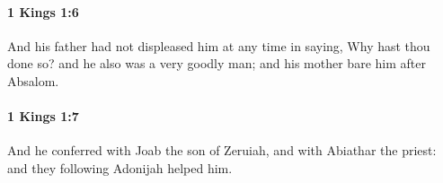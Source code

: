 		\paragraph{1 Kings 1:6} %
			\label{1KINGS-1-6}

			And his father had not displeased him at any time in saying, Why hast thou done so? and he also was a very goodly man; and his mother bare him after Absalom.


		\paragraph{1 Kings 1:7} %
			\label{1KINGS-1-7}

			And he conferred with Joab the son of Zeruiah, and with Abiathar the priest: and they following Adonijah helped him.


